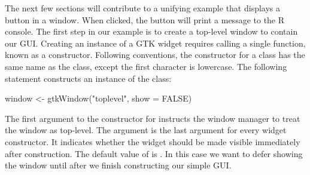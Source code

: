The next few sections will contribute to a unifying example that
displays a button in a window. When clicked, the button will print a
message to the R console. The first step in our example is to create a
top-level window to contain our GUI.  Creating an instance of a GTK\/
widget requires calling a single \R\/ function, known as a
constructor. Following \R\/ conventions, the constructor for a class
has the same name as the class, except the first character is
lowercase. The following statement constructs an instance of the
 class:
\begin{Schunk}
\begin{Sinput}
 window <- gtkWindow("toplevel", show = FALSE)
\end{Sinput}
\end{Schunk}
%
The first argument to the constructor for  instructs
the window manager to treat the window as top-level.  The 
argument is the last argument for every widget constructor. It
indicates whether the widget should be made visible immediately after
construction.  The default value of  is . In
this case we want to defer showing the window until after we finish
constructing our simple GUI.

